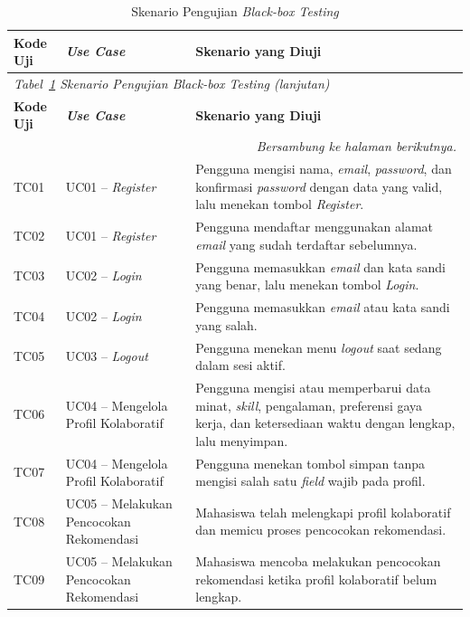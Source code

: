 \begin{longtable}{p{1.5cm} p{5cm} >{\raggedright\arraybackslash}p{\dimexpr\linewidth-6.5cm-6\tabcolsep\relax}}
  \caption{Skenario Pengujian \emph{Black-box Testing}}
  \label{tab:skenario-blackbox} \\
  \toprule
    \textbf{Kode Uji} & \textbf{\emph{Use Case}} & \textbf{Skenario yang Diuji} \\
  \midrule
  \endfirsthead
  \multicolumn{3}{l}{\small\textit{Tabel~\ref{tab:skenario-blackbox} Skenario Pengujian \emph{Black-box Testing} (lanjutan)}} \\
  \toprule
    \textbf{Kode Uji} & \textbf{\emph{Use Case}} & \textbf{Skenario yang Diuji} \\
  \midrule
  \endhead
  \bottomrule
  \multicolumn{3}{r}{\textit{Bersambung ke halaman berikutnya.}} \\
  \endfoot
  \bottomrule
  \endlastfoot
  TC01 & UC01 -- \emph{Register} & Pengguna mengisi nama, \emph{email}, \emph{password}, dan konfirmasi \emph{password} dengan data yang valid, lalu menekan tombol \emph{Register}. \\
  \midrule
  TC02 & UC01 -- \emph{Register} & Pengguna mendaftar menggunakan alamat \emph{email} yang sudah terdaftar sebelumnya. \\
  \midrule
  TC03 & UC02 -- \emph{Login} & Pengguna memasukkan \emph{email} dan kata sandi yang benar, lalu menekan tombol \emph{Login}. \\
  \midrule
  TC04 & UC02 -- \emph{Login} & Pengguna memasukkan \emph{email} atau kata sandi yang salah. \\
  \midrule
  TC05 & UC03 -- \emph{Logout} & Pengguna menekan menu \emph{logout} saat sedang dalam sesi aktif. \\
  \midrule
  TC06 & UC04 -- Mengelola Profil Kolaboratif & Pengguna mengisi atau memperbarui data minat, \emph{skill}, pengalaman, preferensi gaya kerja, dan ketersediaan waktu dengan lengkap, lalu menyimpan. \\
  \midrule
  TC07 & UC04 -- Mengelola Profil Kolaboratif & Pengguna menekan tombol simpan tanpa mengisi salah satu \emph{field} wajib pada profil. \\
  \midrule
  TC08 & UC05 -- Melakukan Pencocokan Rekomendasi & Mahasiswa telah melengkapi profil kolaboratif dan memicu proses pencocokan rekomendasi. \\
  \midrule
  TC09 & UC05 -- Melakukan Pencocokan Rekomendasi & Mahasiswa mencoba melakukan pencocokan rekomendasi ketika profil kolaboratif belum lengkap. \\

\end{longtable}
